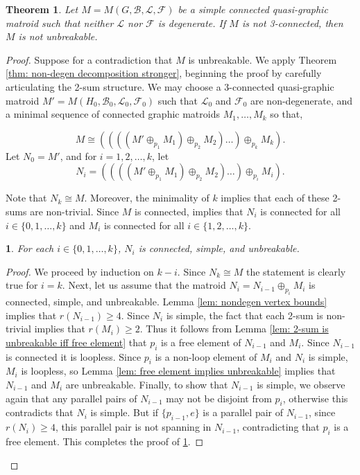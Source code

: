 \documentclass[12pt]{article}
\newtheorem{theorem}{Theorem}[section]
\theoremstyle{definition}
\theoremstyle{plain} %
\newtheorem{subtheorem}{}[theorem]
\newcommand{\cB}{\mathcal{B}}
\newcommand{\cF}{\mathcal{F}}
\newcommand{\cL}{\mathcal{L}}
\newcommand{\qbg}{\ensuremath{(G,\cB,\cL,\cF)}}
\begin{document}
\begin{theorem}
    Let $M=M\qbg$ be a simple connected quasi-graphic matroid such that neither $\cL$ nor $\cF$ is degenerate. If $M$ is not 3-connected, then $M$ is not unbreakable.
\end{theorem}
\begin{proof}
    Suppose for a contradiction that $M$ is unbreakable. We apply Theorem \ref{thm: non-degen decomposition stronger}, beginning the proof by carefully articulating the 2-sum structure. We may choose a 3-connected quasi-graphic matroid $M'=M(H_0,\cB_0,\cL_0,\cF_0)$ such that $\cL_0$ and $\cF_0$ are non-degenerate, and a minimal sequence of connected graphic matroids $M_1,\ldots,M_k$ so that, 
  
    $$
    M\cong((((M'\oplus_{p_1} M_1)\oplus_{p_2} M_2)\ldots)\oplus_{p_k} M_k).
    $$
    Let $N_0 = M'$, and for $i = 1,2,\dots, k$, let 
    $$N_i =((((M'\oplus_{p_1} M_1)\oplus_{p_2} M_2)\ldots)\oplus_{p_i} M_i).$$

    Note that $N_k \cong M$. Moreover, the minimality of $k$ implies that each of these 2-sums are non-trivial.
    Since $M$ is connected, \cite[Proposition 7.1.22]{Oxley2011} implies that $N_i$ is connected for all $i \in \{0,1,\dots, k\}$ and $M_i$ is connected for all $i \in \{1,2,\dots, k\}$.


    \begin{subtheorem}\label{sub: N_i decomp}
        For each $i \in \{0,1,\dots, k\}$, $N_i$ is connected, simple, and unbreakable.
    \end{subtheorem}
    \begin{proof}
        We proceed by induction on $k-i$.  Since $N_k\cong M$ the statement is clearly true for $i=k$.
        Next, let us assume that the matroid $N_i = N_{i-1}\oplus_{p_i} M_i$ is connected, simple, and unbreakable. Lemma \ref{lem: nondegen vertex bounds} implies that $r(N_{i-1})\geq4$. Since $N_{i}$ is simple, the fact that each 2-sum is non-trivial implies that $r(M_{i})\geq2$. Thus it follows from Lemma \ref{lem: 2-sum is unbreakable iff free element} that $p_i$ is a free element of $N_{i-1}$ and $M_i$. Since $N_{i-1}$ is connected it is loopless. Since $p_i$ is a non-loop element of $M_i$ and $N_i$ is simple, $M_i$ is loopless, so Lemma \ref{lem: free element implies unbreakable} implies that $N_{i-1}$ and $M_i$ are unbreakable. Finally, to show that $N_{i-1}$ is simple, we observe again that any parallel pairs of $N_{i-1}$ may not be disjoint from $p_i$, otherwise this contradicts that $N_i$ is simple. But if $\{p_{i-1},e\}$ is a parallel pair of $N_{i-1}$, since $r(N_i)\geq 4$, this parallel pair is not spanning in $N_{i-1}$, contradicting that $p_i$ is a free element. This completes the proof of \ref{sub: N_i decomp}.
    \end{proof}
    

\end{proof}
\end{document}
